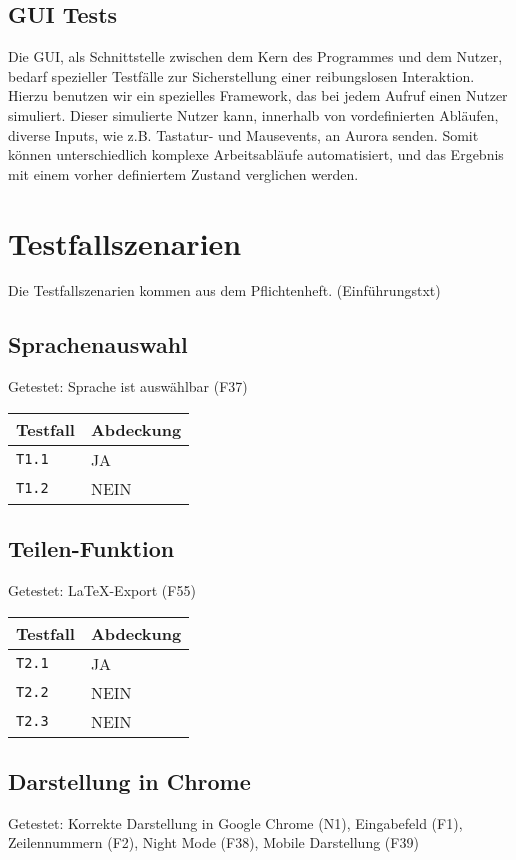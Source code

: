 \documentclass[parskip=full,11pt,twoside]{scrartcl}
\newcommand{\testline}[2]{
    \texttt{#1} & \ifthenelse{\equal{#2}{JA}}{\cellcolor{green!20}}{\cellcolor{red!20}}#2 \\ \hline
}
\begin{document}
\subsection{GUI Tests}
Die GUI, als Schnittstelle zwischen dem Kern des Programmes und dem Nutzer, bedarf spezieller Testfälle zur Sicherstellung einer reibungslosen Interaktion.
Hierzu benutzen wir ein spezielles Framework, das bei jedem Aufruf einen Nutzer simuliert.
Dieser simulierte Nutzer kann, innerhalb von vordefinierten Abläufen, diverse Inputs, wie z.B. Tastatur- und Mausevents, an Aurora senden.
Somit können unterschiedlich komplexe Arbeitsabläufe automatisiert, und das Ergebnis mit einem vorher definiertem Zustand verglichen werden.

\section{Testfallszenarien}
    Die Testfallszenarien kommen aus dem Pflichtenheft. (Einführungstxt)

\subsection{Sprachenauswahl}
    Getestet:
    Sprache ist auswählbar (F37)

    \label{shortcuts}
    \begin{center}
        \begin{tabular}{ p{9cm} p{4cm}}
            Testfall & Abdeckung \\ \hline
            \testline{T1.1}{JA}
            \testline{T1.2}{NEIN}
        \end{tabular}
    \end{center}

\subsection{Teilen-Funktion}
    Getestet:
    LaTeX-Export (F55)

    \label{shortcuts}
    \begin{center}
        \begin{tabular}{ p{9cm} p{4cm}}
            Testfall & Abdeckung \\ \hline
            \testline{T2.1}{JA}
            \testline{T2.2}{NEIN}
            \testline{T2.3}{NEIN}
        \end{tabular}
    \end{center}

\subsection{Darstellung in Chrome}
    Getestet:
    Korrekte Darstellung in Google Chrome (N1),
    Eingabefeld (F1),
    Zeilennummern (F2),
    Night Mode (F38),
    Mobile Darstellung (F39)
\end{document}
